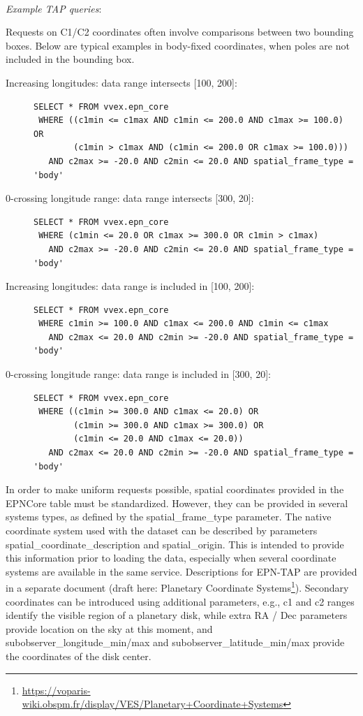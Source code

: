 \documentclass[11pt,a4paper]{ivoa}
\begin{document}
\textbf{\\}
\emph{Example TAP queries}:

Requests on C1/C2 coordinates often involve comparisons between two
bounding boxes. Below are typical examples in body-fixed coordinates,
when poles are not included in the bounding box.
\begin{description}
\item[Increasing longitudes: data range intersects {[100, 200]}:]\mbox{}
\begin{verbatim}
SELECT * FROM vvex.epn_core
 WHERE ((c1min <= c1max AND c1min <= 200.0 AND c1max >= 100.0) OR
        (c1min > c1max AND (c1min <= 200.0 OR c1max >= 100.0)))
   AND c2max >= -20.0 AND c2min <= 20.0 AND spatial_frame_type = 'body'
\end{verbatim}

\item[0-crossing longitude range: data range intersects {[300, 20]}:]\mbox{}
\begin{verbatim}
SELECT * FROM vvex.epn_core
 WHERE (c1min <= 20.0 OR c1max >= 300.0 OR c1min > c1max)
   AND c2max >= -20.0 AND c2min <= 20.0 AND spatial_frame_type = 'body'
\end{verbatim}

\item[Increasing longitudes: data range is included in {[100, 200]}:]\mbox{}
\begin{verbatim}
SELECT * FROM vvex.epn_core
 WHERE c1min >= 100.0 AND c1max <= 200.0 AND c1min <= c1max
   AND c2max <= 20.0 AND c2min >= -20.0 AND spatial_frame_type = 'body'
\end{verbatim}

\item[0-crossing longitude range: data range is included in {[300, 20]}:]\mbox{}
\begin{verbatim}
SELECT * FROM vvex.epn_core
 WHERE ((c1min >= 300.0 AND c1max <= 20.0) OR
        (c1min >= 300.0 AND c1max >= 300.0) OR
        (c1min <= 20.0 AND c1max <= 20.0))
   AND c2max <= 20.0 AND c2min >= -20.0 AND spatial_frame_type = 'body'
\end{verbatim}
\end{description}

In order to make uniform requests possible, spatial coordinates provided
in the EPNCore table must be standardized. However, they can be provided
in several systems types, as defined by the spatial\_frame\_type
parameter. The native coordinate system used with the dataset can
be described by parameters spatial\_coordinate\_description and
spatial\_origin. This is intended to provide this information
prior to loading the data, especially when several coordinate
systems are available in the same service. Descriptions for EPN-TAP
are provided in a separate document (draft here: Planetary Coordinate
Systems\footnote{\url{https://voparis-wiki.obspm.fr/display/VES/Planetary+Coordinate+Systems}}).
Secondary coordinates can be introduced using additional parameters,
e.g., c1 and c2 ranges identify the visible region of a planetary
disk, while extra RA / Dec parameters provide location on the
sky at this moment, and subobserver\_longitude\_min/max and
subobserver\_latitude\_min/max provide the coordinates of the disk center.
\end{document}

